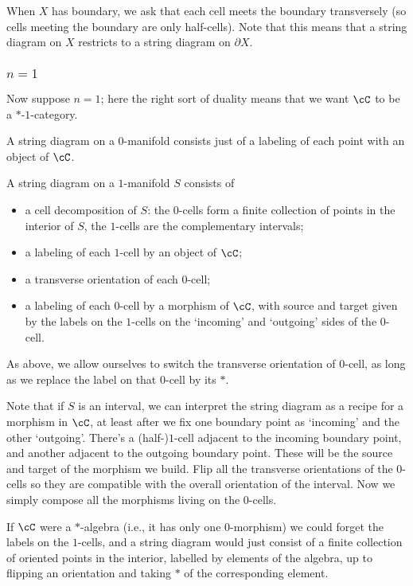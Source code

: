 \documentclass[11pt]{amsart}
\theoremstyle{plain}
\newcommand{\bdy}{\partial}
\begin{document}
When $X$ has boundary, we ask that each cell meets the boundary transversely (so cells meeting the boundary are only half-cells). Note that this means that a string diagram on $X$ restricts to a string diagram on $\bdy X$.

\subsubsection{$n=1$}
Now suppose $n=1$; here the right sort of duality means that we want $\cC$ to be a $*$-$1$-category.

A string diagram on a $0$-manifold consists just of a labeling of each point with an object of $\cC$.

A string diagram on a $1$-manifold $S$ consists of
\begin{itemize}
\item a cell decomposition of $S$: the $0$-cells form a finite collection of points in the interior of $S$, the $1$-cells are the complementary intervals;
\item a labeling of each $1$-cell by an object of $\cC$;
\item a transverse orientation of each $0$-cell;
\item a labeling of each $0$-cell by a morphism of $\cC$, with source and target given by the labels on the $1$-cells on the `incoming' and `outgoing' sides of the $0$-cell.
\end{itemize}
As above, we allow ourselves to switch the transverse orientation of  $0$-cell, as long as we replace the label on that $0$-cell by its $*$.

Note that if $S$ is an interval, we can interpret the string diagram as a recipe for a morphism in $\cC$, at least after we fix one boundary point as `incoming' and the other `outgoing'. There's a (half-)$1$-cell adjacent to the incoming boundary point, and another adjacent to the outgoing boundary point. These will be the source and target of the morphism we build. Flip all the transverse orientations of the $0$-cells so they are compatible with the overall orientation of the interval. Now we simply compose all the morphisms living on the $0$-cells.

If $\cC$ were a $*$-algebra (i.e., it has only one $0$-morphism) we could forget the labels on the $1$-cells, and a string diagram would just consist of a finite collection of oriented points in the interior, labelled by elements of the algebra, up to flipping an orientation and taking $*$ of the corresponding element.
\end{document}

